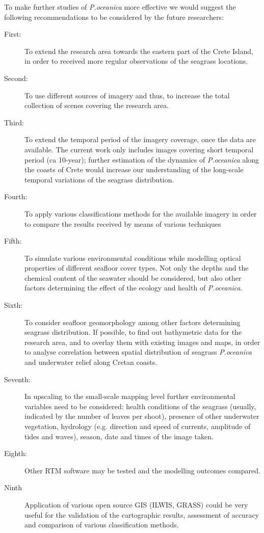 \documentclass[11pt]{article}
\begin{document}
To make further studies of \textit{P.oceanica} more effective we would suggest the following recommendations to be considered by the future researchers:
	\begin{description}
		\item[First:] To extend the research area towards the eastern part of the Crete Island, in order to received more regular observations of the 	seagrass locations.
		\item[Second:] To use different sources of imagery and thus, to increase the total collection of scenes covering the research area.
		\item[Third:] To extend the temporal period of the imagery coverage, once the data are available. The current work only includes images covering short temporal period (ca 10-year); further estimation of the dynamics of \textit{P.oceanica} along the coasts of Crete would increase our understanding of the long-scale temporal variations of the seagrass distribution.
		\item[Fourth:] To apply various classifications methods for the available imagery in order to compare the results received by means of various techniques
		\item[Fifth:] To simulate various environmental conditions while modelling optical properties of different seafloor cover types. Not only the depths and 	the chemical content of the seawater should be considered, but also other factors determining the effect of the ecology and health of \textit{P.oceanica}.
		\item[Sixth:] To consider seafloor geomorphology among other factors determining seagrass distribution. If possible, to find out bathymetric data for the research area, and to overlay them with existing images and maps, in order to analyse correlation between spatial distribution of seagrass \textit{P.oceanica} and underwater relief along Cretan coasts. 
		\item[Seventh:] In upscaling to the small-scale mapping level further environmental variables need to be considered: health conditions of the seagrass (usually, indicated by the number of leaves per shoot), presence of other underwater vegetation, hydrology (e.g. direction and speed of currents, amplitude of tides and waves), season, date and times of the image taken.
		\item[Eighth:] Other \ac{RTM} software may be tested and the modelling outcomes compared.
		\item[Ninth] Application of various open source \ac{GIS} (\ac{ILWIS}, \ac{GRASS}) could be very useful for the validation of the cartographic results, assessment of accuracy and comparison of various classification methods. 

\end{description}
\end{document}
